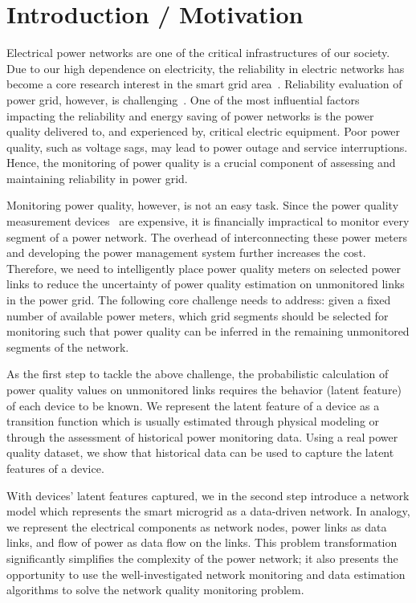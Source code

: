 \normalsize
\section{Introduction / Motivation}
Electrical power networks are one of the critical infrastructures of our society. Due to our high dependence on electricity, the reliability in electric networks has become a core research interest in the smart grid area~\cite{Moslehim10}. Reliability evaluation of power grid, however, is challenging~\cite{Albert04}. One of the most influential factors impacting the reliability and energy saving of power networks is the power quality delivered to, and experienced by, critical electric equipment. Poor power quality, such as voltage sags, may lead to power outage and service interruptions. Hence, the monitoring of power quality is a crucial component of assessing and maintaining reliability in power grid.

Monitoring power quality, however, is not an easy task. Since the power quality measurement devices~\cite{schneider_meter} are expensive, it is financially impractical to monitor every segment of a power network. The overhead of interconnecting these power meters and developing the power management system further increases the cost. Therefore, we need to intelligently place power quality meters on selected power links to reduce the uncertainty of power quality estimation on unmonitored links in the power grid. The following core challenge needs to address: given a fixed number of available power meters, which grid segments should be selected for monitoring such that power quality can be inferred in the remaining unmonitored segments of the network.

As the first step to tackle the above challenge, the probabilistic calculation of power quality values on unmonitored links requires the behavior (latent feature) of each device to be known. We represent the latent feature of a device as a transition function which is usually estimated through physical modeling or through the assessment of historical power monitoring data. Using a real power quality dataset, we show that historical data can be used to capture the latent features of a device.

With devices' latent features captured, we in the second step introduce a network model which represents the smart microgrid as a data-driven network. In analogy, we represent the electrical components as network nodes, power links as data links, and flow of power as data flow on the links. This problem transformation significantly simplifies the complexity of the power network; it also presents the opportunity to use the well-investigated network monitoring and data estimation algorithms to solve the network quality monitoring problem.

